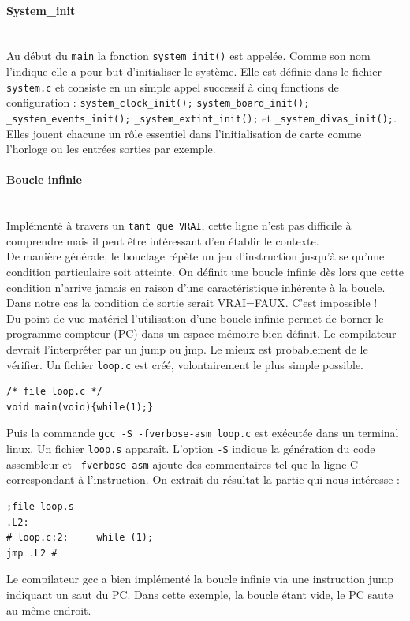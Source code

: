 \documentclass[a4paper]{article}
\begin{document}
\paragraph{System\_init}
~~\\
Au début du \texttt{main} la fonction \texttt{system\_init()} est appelée. Comme son nom l'indique elle a pour but d'initialiser le système. Elle est définie dans le fichier \texttt{system.c} et consiste en un simple appel successif à cinq fonctions de configuration : 	 
	\texttt{system\_clock\_init();}
	 \texttt{system\_board\_init();}
	 \texttt{\_system\_events\_init();}
	 \texttt{\_system\_extint\_init();}
	 et  \texttt{\_system\_divas\_init();}.
Elles jouent chacune un rôle essentiel dans l'initialisation de carte comme l'horloge ou les entrées sorties par exemple.

\paragraph{Boucle infinie}
~~\\
Implémenté à travers un \texttt{tant que VRAI}, cette ligne n'est pas difficile à comprendre mais il peut être intéressant d'en établir le contexte. \\
De manière générale, le bouclage répète un jeu d'instruction jusqu'à se qu'une condition particulaire soit atteinte. On définit une boucle infinie dès lors que cette condition n'arrive jamais en raison d'une caractéristique inhérente à la boucle. Dans notre cas la condition de sortie serait VRAI=FAUX. C'est impossible ! \\
Du point de vue matériel l'utilisation d'une boucle infinie permet de borner le programme compteur (PC) dans un espace mémoire bien définit. Le compilateur devrait l'interpréter par un jump ou jmp. Le mieux est probablement de le vérifier. Un fichier \texttt{loop.c} est créé, volontairement le plus simple possible.
\begin{lstlisting}[style=CStyle]
/* file loop.c */
void main(void){while(1);}
\end{lstlisting}
Puis la commande \texttt{gcc -S -fverbose-asm loop.c} est exécutée dans un terminal linux. Un fichier \texttt{loop.s} apparaît. L'option \texttt{-S} indique la génération du code assembleur et \texttt{-fverbose-asm} ajoute des commentaires tel que la ligne C correspondant à l'instruction. On extrait du résultat la partie qui nous intéresse :
\begin{lstlisting}[language={[x86masm]Assembler}]
;file loop.s
.L2:
# loop.c:2: 	while (1);
jmp	.L2	#
\end{lstlisting}
Le compilateur gcc a bien implémenté la boucle infinie via une instruction jump indiquant un saut du PC. Dans cette exemple, la boucle étant vide, le PC saute au même endroit.
\end{document}

